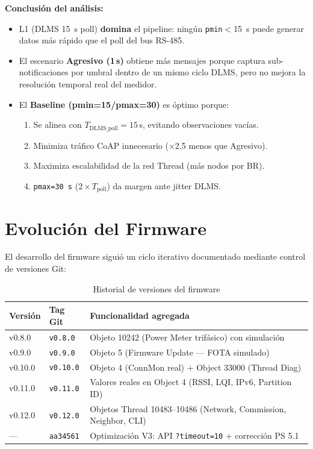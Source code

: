 \documentclass[11pt,a4paper]{article}
\begin{document}
\noindent\textbf{Conclusión del análisis:}
\begin{itemize}[leftmargin=1.2cm]
  \item L1 (DLMS \SI{15}{\second} poll) \textbf{domina} el pipeline: ningún \texttt{pmin}$<$\SI{15}{\second}
        puede generar datos más rápido que el poll del bus RS-485.
  \item El escenario \textbf{Agresivo (1\,s)} obtiene más mensajes porque captura
        sub-notificaciones por umbral dentro de un mismo ciclo DLMS, pero no mejora
        la resolución temporal real del medidor.
  \item El \textbf{Baseline (pmin=15/pmax=30)} es óptimo porque:
    \begin{enumerate}
      \item Se alinea con $T_{\text{DLMS\_poll}}=15$\,s, evitando observaciones vacías.
      \item Minimiza tráfico CoAP innecesario ($\times$2,5 menos que Agresivo).
      \item Maximiza escalabilidad de la red Thread (más nodos por BR).
      \item \texttt{pmax=30\,s} ($2\times T_{\text{poll}}$) da margen ante jitter DLMS.
    \end{enumerate}
\end{itemize}

\section{Evolución del Firmware}

El desarrollo del firmware siguió un ciclo iterativo documentado mediante control de versiones Git:

\begin{table}[H]
\centering
\caption{Historial de versiones del firmware}
\label{tab:versiones-fw}
\begin{tabularx}{\textwidth}{l l X}
\toprule
\textbf{Versión} & \textbf{Tag Git} & \textbf{Funcionalidad agregada} \\
\midrule
v0.8.0 & \texttt{v0.8.0} & Objeto 10242 (Power Meter trifásico) con simulación \\
v0.9.0 & \texttt{v0.9.0} & Objeto 5 (Firmware Update --- FOTA simulado) \\
v0.10.0 & \texttt{v0.10.0} & Objeto 4 (ConnMon real) + Object 33000 (Thread Diag) \\
v0.11.0 & \texttt{v0.11.0} & Valores reales en Object 4 (RSSI, LQI, IPv6, Partition ID) \\
v0.12.0 & \texttt{v0.12.0} & Objetos Thread 10483--10486 (Network, Commission, Neighbor, CLI) \\
--- & \texttt{aa34561} & Optimización V3: API \texttt{?timeout=10} + corrección PS 5.1 \\
\bottomrule
\end{tabularx}
\end{table}
\end{document}
